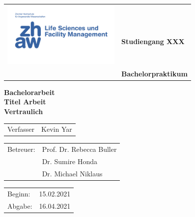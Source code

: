 \begin{titlepage}
\begin{table}
\begin{tabular}{L{300px}l}
 & \\ \rule{0pt}{54px}
    & \textbf{\Large{Studiengang XXX}}\\
    & \textbf{\Large{Bachelorpraktikum}}\\
\end{tabular}
\end{table}
 
\vspace{10cm}

\vspace*{0.9cm}
\begin{center}
    \textbf{\Large{Bachelorarbeit}}\\ \vspace{1.0cm}
    \textbf{\huge{Titel Arbeit}}\\ \vspace{1.0cm}
    \textbf{\Large{Vertraulich}}
\end{center}

\vspace{7cm} 
\begin{tabular}{L{5cm}l}
\LARGE{Verfasser} &
Kevin Yar \\
\end{tabular}

\vspace{1cm}
\begin{tabular}{L{5cm}l}
	
\Large{Betreuer:} & Prof. Dr. Rebecca Buller \\ 
 & Dr. Sumire Honda \\
 & Dr. Michael Niklaus\\

\end{tabular}


\vspace{1.5cm}

\begin{tabular}{L{5cm}l}
\Large{Beginn:} & 15.02.2021 \\

\Large{Abgabe:} & 16.04.2021\\

\end{tabular}

\end{titlepage}


